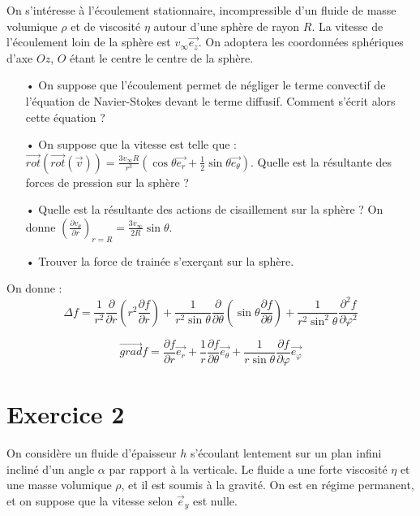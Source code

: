 \documentclass{report}
\begin{document}
On s'intéresse à l'écoulement stationnaire, incompressible d'un fluide de masse volumique $\rho$ et de viscosité $\eta$ autour d'une sphère de rayon $R$. La vitesse de l'écoulement loin de la sphère est $v_\infty\vec{e_z}$. On adoptera les coordonnées sphériques d'axe $Oz$, $O$ étant le centre le centre de la sphère. 

\begin{itemize}
	\item[•] On suppose que l'écoulement permet de négliger le terme convectif de l'équation de Navier-Stokes devant le terme diffusif. Comment s'écrit alors cette équation ? 
	\item[•] On suppose que la vitesse est telle que : $\vec{rot}(\vec{rot}(\vec{v}))=\frac{3v_\infty R}{r^3}\left(\cos\theta\vec{e_r}+\frac{1}{2}\sin\theta\vec{e_\theta} \right) $. Quelle est la résultante des forces de pression sur la sphère ? 
	\item[•] Quelle est la résultante des actions de cisaillement sur la sphère ? On donne $\left(\frac{\partial v_\theta}{\partial r}\right)_{r=R}=\frac{3v_\infty}{2R}\sin\theta  $.
	\item[•] Trouver la force de trainée s'exerçant sur la sphère. 
\end{itemize}

On donne : 
\begin{equation}
	\Delta f = \frac{1}{r^2}\frac{\partial}{\partial r} \left(r^2\frac{\partial f}{\partial r} \right) + \frac{1}{r^2\sin\theta}\frac{\partial}{\partial \theta} \left(\sin\theta\frac{\partial f}{\partial \theta} \right) + \frac{1}{r^2\sin^2\theta}\frac{\partial^2 f}{\partial \varphi^2} 
\end{equation}

\begin{equation}
	\vec{grad} f = \frac{\partial f}{\partial r} \vec{e_r} + \frac{1}{r}\frac{\partial f}{\partial \theta}\vec{e_\theta} + \frac{1}{r\sin\theta}\frac{\partial f}{\partial \varphi}\vec{e_\varphi}
\end{equation}

\newpage

\section*{Exercice 2}

On considère un fluide d'épaisseur $h$ s'écoulant lentement sur un plan infini incliné d'un angle $\alpha$ par rapport à la verticale. Le fluide a une forte viscosité $\eta$ et une masse volumique $\rho$, et il est soumis à la gravité. On est en régime permanent, et on suppose que la vitesse selon $\vec{e}_y$ est nulle.
\end{document}
